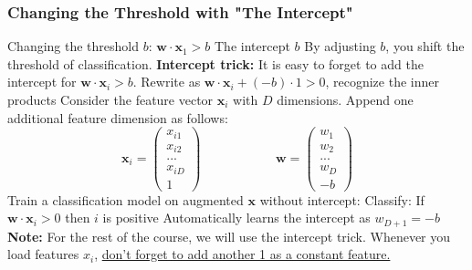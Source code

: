 \documentclass{article}
\renewcommand{\vec}[1]{%
	\mathbf{#1}%
}
\begin{document}
	\subsubsection{Changing the Threshold with "The Intercept"}
	\begin{outline}
		\1 Changing the threshold $b$: $\vec{w} \cdot \vec{x}_1 > b$ \hspace{2em} The intercept $b$
		\1 By adjusting $b$, you shift the threshold of classification.
		\1 \textbf{Intercept trick:} It is easy to forget to add the intercept for $\vec{w} \cdot \vec{x}_i > b$.
		\2 Rewrite as $\vec{w} \cdot \vec{x}_i + (-b)\cdot 1 > 0$, recognize the inner products
		\2 Consider the feature vector $\vec{x}_i$ with $D$ dimensions. Append one additional feature dimension as follows:
		\begin{equation*}
			\vec{x}_i =
			\begin{pmatrix} x_{i1} \\ x_{i2} \\ ... \\ x_{iD} \\ 1 
			\end{pmatrix} 
			\hspace{70pt}
			\vec{w} = 
			\begin{pmatrix} w_1 \\ w_2 \\ ... \\ w_D \\ -b
			\end{pmatrix}
		\end{equation*}
		\2 Train a classification model on augmented $\vec{x}$ without intercept:
		\3 Classify: If $\vec{w} \cdot \vec{x}_i > 0$ then $i$ is positive
		\2 Automatically learns the intercept as $w_{D+1} = -b$
		\1 \textbf{Note:} For the rest of the course, we will use the intercept trick. Whenever you load features $x_i$, \underline{don't forget to add another 1 as a constant feature.}
	\end{outline}
\end{document}
